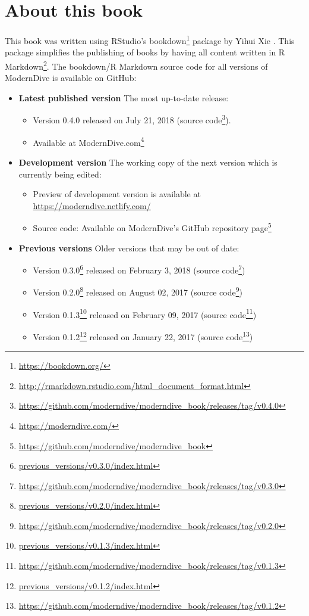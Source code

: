 \documentclass[12pt,]{krantz}
\providecommand{\tightlist}{%
  \setlength{\itemsep}{0pt}\setlength{\parskip}{0pt}}
\renewcommand{\href}[2]{#2\footnote{\url{#1}}}
\begin{document}
\hypertarget{sec:about-book}{\section{About this
book}\label{sec:about-book}}

This book was written using RStudio's
\href{https://bookdown.org/}{bookdown} package by Yihui Xie
\citep{R-bookdown}. This package simplifies the publishing of books by
having all content written in
\href{http://rmarkdown.rstudio.com/html_document_format.html}{R
Markdown}. The bookdown/R Markdown source code for all versions of
ModernDive is available on GitHub:

\begin{itemize}
\tightlist
\item
  \textbf{Latest published version} The most up-to-date release:

  \begin{itemize}
  \tightlist
  \item
    Version 0.4.0 released on July 21, 2018
    (\href{https://github.com/moderndive/moderndive_book/releases/tag/v0.4.0}{source
    code}).
  \item
    Available at \href{https://moderndive.com/}{ModernDive.com}
  \end{itemize}
\item
  \textbf{Development version} The working copy of the next version
  which is currently being edited:

  \begin{itemize}
  \tightlist
  \item
    Preview of development version is available at
    \url{https://moderndive.netlify.com/}
  \item
    Source code: Available on ModernDive's
    \href{https://github.com/moderndive/moderndive_book}{GitHub
    repository page}
  \end{itemize}
\item
  \textbf{Previous versions} Older versions that may be out of date:

  \begin{itemize}
  \tightlist
  \item
    \href{previous_versions/v0.3.0/index.html}{Version 0.3.0} released
    on February 3, 2018
    (\href{https://github.com/moderndive/moderndive_book/releases/tag/v0.3.0}{source
    code})
  \item
    \href{previous_versions/v0.2.0/index.html}{Version 0.2.0} released
    on August 02, 2017
    (\href{https://github.com/moderndive/moderndive_book/releases/tag/v0.2.0}{source
    code})
  \item
    \href{previous_versions/v0.1.3/index.html}{Version 0.1.3} released
    on February 09, 2017
    (\href{https://github.com/moderndive/moderndive_book/releases/tag/v0.1.3}{source
    code})
  \item
    \href{previous_versions/v0.1.2/index.html}{Version 0.1.2} released
    on January 22, 2017
    (\href{https://github.com/moderndive/moderndive_book/releases/tag/v0.1.2}{source
    code})
  \end{itemize}
\end{itemize}
\end{document}
